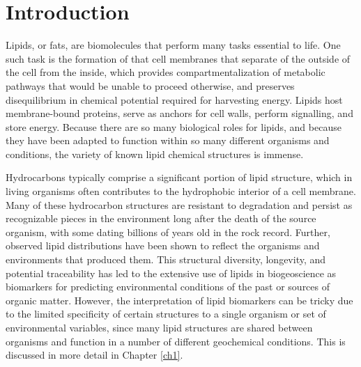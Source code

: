 \chapter{Introduction}


Lipids, or fats, are biomolecules that perform many tasks essential to life. One such task is the formation of that cell membranes that separate of the outside of the cell from the inside, which provides compartmentalization of metabolic pathways that would be unable to proceed otherwise, and preserves disequilibrium in chemical potential required for harvesting energy. Lipids host membrane-bound proteins, serve as anchors for cell walls, perform signalling, and store energy. Because there are so many biological roles for lipids, and because they have been adapted to function within so many different organisms and conditions, the variety of known lipid chemical structures is immense.

Hydrocarbons typically comprise a significant portion of lipid structure, which in living organisms often contributes to the hydrophobic interior of a cell membrane. Many of these hydrocarbon structures are resistant to degradation and persist as recognizable pieces in the environment long after the death of the source organism, with some dating billions of years old in the rock record. Further, observed lipid distributions have been shown to reflect the organisms and environments that produced them. This structural diversity, longevity, and potential traceability has led to the extensive use of lipids in biogeoscience as biomarkers for predicting environmental conditions of the past or sources of organic matter. However, the interpretation of lipid biomarkers can be tricky due to the limited specificity of certain structures to a single organism or set of environmental variables, since many lipid structures are shared between organisms and function in a number of different geochemical conditions. This is discussed in more detail in Chapter \ref{ch1}.

